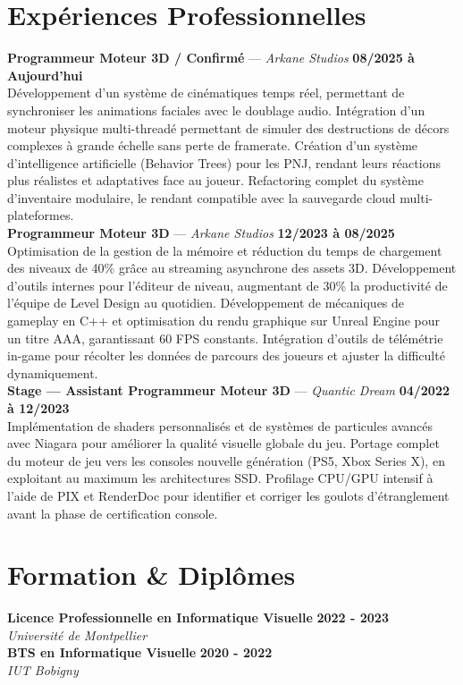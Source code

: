 \documentclass[11pt,a4paper]{article}
\begin{document}
\section*{Expériences Professionnelles}
\noindent \textbf{Programmeur Moteur 3D / Confirmé} --- \textit{Arkane Studios} \hfill \textbf{08/2025 à Aujourd'hui} \\
Développement d'un système de cinématiques temps réel, permettant de synchroniser les animations faciales avec le doublage audio. Intégration d'un moteur physique multi-threadé permettant de simuler des destructions de décors complexes à grande échelle sans perte de framerate. Création d'un système d'intelligence artificielle (Behavior Trees) pour les PNJ, rendant leurs réactions plus réalistes et adaptatives face au joueur. Refactoring complet du système d'inventaire modulaire, le rendant compatible avec la sauvegarde cloud multi-plateformes. \\[0.3cm]
\noindent \textbf{Programmeur Moteur 3D} --- \textit{Arkane Studios} \hfill \textbf{12/2023 à 08/2025} \\
Optimisation de la gestion de la mémoire et réduction du temps de chargement des niveaux de 40\% grâce au streaming asynchrone des assets 3D. Développement d'outils internes pour l'éditeur de niveau, augmentant de 30\% la productivité de l'équipe de Level Design au quotidien. Développement de mécaniques de gameplay en C++ et optimisation du rendu graphique sur Unreal Engine pour un titre AAA, garantissant 60 FPS constants. Intégration d'outils de télémétrie in-game pour récolter les données de parcours des joueurs et ajuster la difficulté dynamiquement. \\[0.3cm]
\noindent \textbf{Stage — Assistant Programmeur Moteur 3D} --- \textit{Quantic Dream} \hfill \textbf{04/2022 à 12/2023} \\
Implémentation de shaders personnalisés et de systèmes de particules avancés avec Niagara pour améliorer la qualité visuelle globale du jeu. Portage complet du moteur de jeu vers les consoles nouvelle génération (PS5, Xbox Series X), en exploitant au maximum les architectures SSD. Profilage CPU/GPU intensif à l'aide de PIX et RenderDoc pour identifier et corriger les goulots d'étranglement avant la phase de certification console. \\[0.3cm]


\vspace{0.3cm}

\section*{Formation \& Diplômes}
\noindent \textbf{Licence Professionnelle en Informatique Visuelle} \hfill \textbf{2022 - 2023} \\
\textit{Université de Montpellier} \\[0.3cm]
\noindent \textbf{BTS en Informatique Visuelle} \hfill \textbf{2020 - 2022} \\
\textit{IUT Bobigny} \\[0.3cm]
\end{document}
